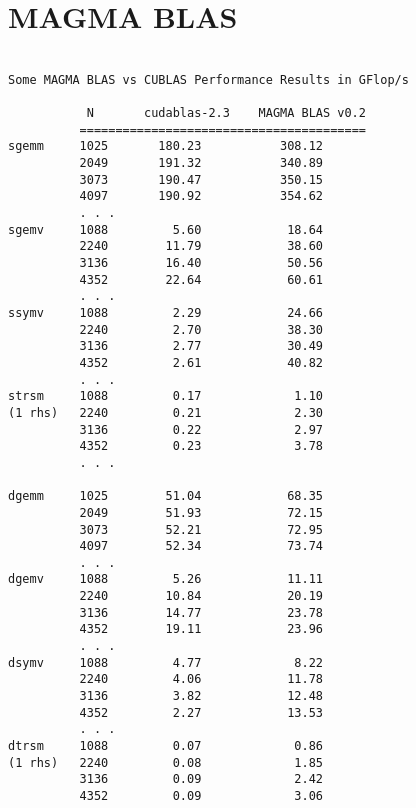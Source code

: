 \documentclass[10pt]{book}
\begin{document}
\newpage
\section{MAGMA BLAS}
\begin{verbatim}

Some MAGMA BLAS vs CUBLAS Performance Results in GFlop/s 

           N       cudablas-2.3    MAGMA BLAS v0.2
          ========================================
sgemm     1025       180.23           308.12
          2049       191.32           340.89
          3073       190.47           350.15
          4097       190.92           354.62
          . . .
sgemv     1088         5.60            18.64
          2240        11.79            38.60
          3136        16.40            50.56
          4352        22.64            60.61
          . . .
ssymv     1088         2.29            24.66
          2240         2.70            38.30
          3136         2.77            30.49
          4352         2.61            40.82
          . . .
strsm     1088         0.17             1.10
(1 rhs)   2240         0.21             2.30
          3136         0.22             2.97
          4352         0.23             3.78
          . . .

dgemm     1025        51.04            68.35
          2049        51.93            72.15
          3073        52.21            72.95
          4097        52.34            73.74
          . . .
dgemv     1088         5.26            11.11
          2240        10.84            20.19 
          3136        14.77            23.78
          4352        19.11            23.96	
          . . .
dsymv     1088         4.77             8.22
          2240         4.06            11.78
          3136         3.82            12.48
          4352         2.27            13.53
          . . .
dtrsm     1088         0.07             0.86
(1 rhs)   2240         0.08             1.85
          3136         0.09             2.42
          4352         0.09             3.06
\end{verbatim}

\end{document}

